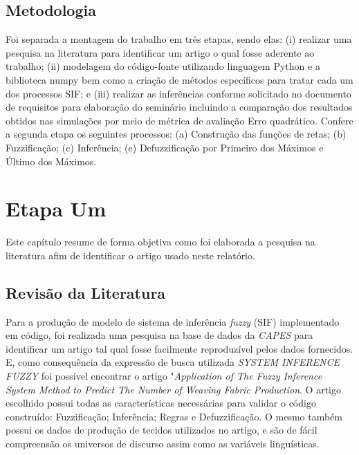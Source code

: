 \documentclass[courier]{uninove-ppgi}
\begin{document}
        
  
    
    \section{Metodologia}
    
	    Foi separada a montagem do trabalho em três etapas, sendo elas: (i) realizar uma pesquisa na literatura para identificar um artigo o qual fosse aderente ao trabalho; (ii) modelagem do código-fonte utilizando linguagem Python e a biblioteca numpy bem como a criação de métodos específicos para tratar cada um dos processos SIF; e (iii) realizar as inferências conforme solicitado no documento de requisitos para elaboração do seminário incluindo a comparação dos resultados obtidos nas simulações por meio de métrica de avaliação Erro quadrático. Confere a segunda etapa os seguintes processos: (a) Construção das funções de retas; (b) Fuzzificação; (c) Inferência; (e) Defuzzificação por Primeiro dos Máximos e Último dos Máximos.
		    
    
     \chapter{Etapa Um}
    
        \begin{resumocapitulo}
            Este capítulo resume de forma objetiva como foi elaborada a pesquisa na literatura afim de identificar o artigo usado neste relatório. 
        \end{resumocapitulo}
		
		\section{Revisão da Literatura}
		
    		Para a produção de modelo de sistema de inferência \textit{fuzzy} (SIF) implementado em código, foi realizada uma pesquisa na base de dados da \textit{CAPES} 
    		para identificar um artigo tal qual fosse facilmente reproduzível pelos dados fornecidos. E, como consequência da expressão de busca utilizada \textit{SYSTEM INFERENCE FUZZY} 
    		foi possível encontrar o artigo "\textit{Application of The Fuzzy Inference System Method to Predict The Number of Weaving Fabric Production}.
    		O artigo escolhido possui todas as características necessárias para validar o código construído: Fuzzificação; Inferência; Regras e Defuzzificação.
    		O mesmo também possui os dados de produção de tecidos utilizados no artigo, e são de fácil compreensão os universos de discurso assim como as variáveis linguísticas.
    
\end{document}
